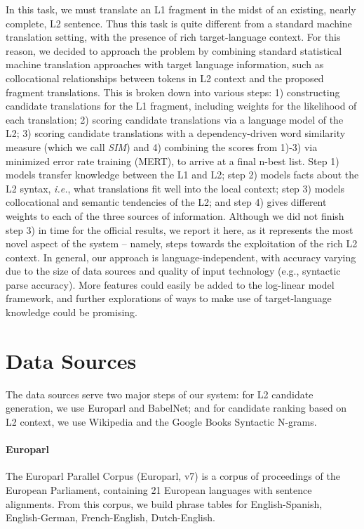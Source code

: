 \documentclass[11pt]{article}
\begin{document}
In this task, we must translate an L1 fragment in the midst of an existing,
nearly complete, L2 sentence. Thus this task is quite different from a standard
machine translation setting, with the presence of rich target-language context.
For this reason, we decided to approach the problem by combining standard
statistical machine translation approaches with target language information,
such as collocational relationships between tokens in L2 context and the
proposed fragment translations.
This is broken down into various steps: 1) constructing candidate translations
for the L1 fragment, including weights for the likelihood of each translation;
2) scoring candidate translations via a language model of the L2; 3) scoring
candidate translations with a dependency-driven word similarity measure
\cite{lin:98} (which we call \textit{SIM})
and 4) combining the scores from 1)-3) via minimized error rate training
(MERT), to arrive at a final n-best list.  Step 1) models transfer knowledge
between the L1 and L2; step 2) models facts about the L2 syntax, \emph{i.e.}, what
translations fit well into the local context; step 3) models collocational and
semantic tendencies of the L2; and step 4)  gives different weights to each of
the three sources of information.  Although we did not finish step 3) in time
for the official results, we report it here, as it represents the most novel
aspect of the system -- namely, steps towards the exploitation of the rich L2
context. In general, our approach is language-independent, with accuracy
varying due to the size of data sources and quality of input technology (e.g.,
syntactic parse accuracy). More features could easily be added to the
log-linear model framework, and further explorations of ways to make use of
target-language knowledge could be promising.

\section{Data Sources}
The data sources serve two major steps of our system: for L2 candidate generation, we use Europarl and BabelNet; and for candidate ranking based on L2 context, we use Wikipedia and the Google Books Syntactic N-grams. 

\paragraph{Europarl}  %
The Europarl Parallel Corpus (Europarl, v7) \cite{koehn:05} is a corpus of proceedings of the European Parliament, containing 21 European languages with sentence alignments.
From this corpus, we build phrase tables for English-Spanish, English-German, French-English, Dutch-English.
\end{document}
